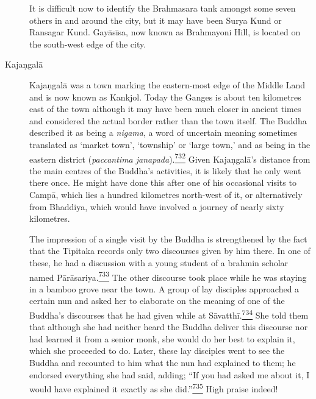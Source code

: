 \begin{description}
It is difficult now to identify the Brahmasara tank amongst some seven
others in and around the city, but it may have been Surya Kund or
Ransagar Kund. Gayāsīsa, now known as Brahmayoni Hill, is located on the
south-west edge of the city.
\item[Kajaṇgalā]
Kajaṇgalā was a town marking the eastern-most edge of the Middle Land
and is now known as Kankjol. Today the Ganges is about ten kilometres
east of the town although it may have been much closer in ancient times
and considered the actual border rather than the town itself. The Buddha
described it as being a \emph{nigama}, a word of uncertain meaning
sometimes translated as `market town', `township' or `large town,' and
as being in the eastern district (\emph{paccantima
janapada}).\label{footprints_split_019.html_fnref732}\hyperref[footprints_split_025.htmlux5cux23fn732]{\textsuperscript{732}}
Given Kajaṇgalā's distance from the main centres of the Buddha's
activities, it is likely that he only went there once. He might have
done this after one of his occasional visits to Campā, which lies a
hundred kilometres north-west of it, or alternatively from Bhaddiya,
which would have involved a journey of nearly sixty kilometres.

The impression of a single visit by the Buddha is strengthened by the
fact that the Tipitaka records only two discourses given by him there.
In one of these, he had a discussion with a young student of a brahmin
scholar named
Pārāsariya.\label{footprints_split_019.html_fnref733}\hyperref[footprints_split_025.htmlux5cux23fn733]{\textsuperscript{733}}
The other discourse took place while he was staying in a bamboo grove
near the town. A group of lay disciples approached a certain nun and
asked her to elaborate on the meaning of one of the Buddha's discourses
that he had given while at
Sāvatthī.\label{footprints_split_019.html_fnref734}\hyperref[footprints_split_025.htmlux5cux23fn734]{\textsuperscript{734}}
She told them that although she had neither heard the Buddha deliver
this discourse nor had learned it from a senior monk, she would do her
best to explain it, which she proceeded to do. Later, these lay
disciples went to see the Buddha and recounted to him what the nun had
explained to them; he endorsed everything she had said, adding; ``If you
had asked me about it, I would have explained it exactly as she
did.''\label{footprints_split_019.html_fnref735}\hyperref[footprints_split_025.htmlux5cux23fn735]{\textsuperscript{735}}
High praise indeed!


\end{description}
